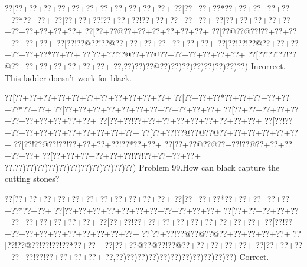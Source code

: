 \documentclass[a5paper]{article}
\begin{document}
\begin{center}
{\goo
\0??[\0??+\0??+\0??+\0??+\0??+\0??+\0??+\0??+\0??+\0??+\0??+
\0??[\0??+\0??+\0??*\0??+\0??+\0??+\0??+\0??+\0??*\0??+\0??+
\0??[\0??+\0??+\0??!\0??+\0??+\0??!\0??+\0??+\0??+\0??+\0??+
\0??[\0??+\0??+\0??+\0??+\0??+\0??+\0??+\0??+\0??+\0??+
\0??[\0??+\0??@\0??+\0??+\0??+\0??+\0??+\0??+
\0??[\0??@\0??@\0??!\0??+\0??+\0??+\0??+\0??+\0??+
\0??[\0??!\0??@\0??!\0??@\0??+\0??+\0??+\0??+\0??+\0??+\0??+
\0??[\0??!\0??!\0??@\0??+\0??+\0??+\0??+\0??+\0??*\0??+\0??+
\0??[\0??+\0??!\0??@\0??+\0??@\0??+\0??+\0??+\0??+\0??+\0??+
\0??[\0??!\0??!\0??!\0??@\0??+\0??+\0??+\0??+\0??+\0??+\0??+
\0??,\0??)\0??)\0??@\0??)\0??)\0??)\0??)\0??)\0??)\0??)\0??)
}
Incorrect. This ladder doesn't work for black.

\end{center}
\newpage
\begin{center}
{\goo
\0??[\0??+\0??+\0??+\0??+\0??+\0??+\0??+\0??+\0??+\0??+\0??+
\0??[\0??+\0??+\0??*\0??+\0??+\0??+\0??+\0??+\0??*\0??+\0??+
\0??[\0??+\0??+\0??+\0??+\0??+\0??+\0??+\0??+\0??+\0??+\0??+
\0??[\0??+\0??+\0??+\0??+\0??+\0??+\0??+\0??+\0??+\0??+\0??+
\0??[\0??+\0??!\0??+\0??+\0??+\0??+\0??+\0??+\0??+\0??+\0??+
\0??[\0??!\0??+\0??+\0??+\0??+\0??+\0??+\0??+\0??+\0??+\0??+
\0??[\0??+\0??!\0??@\0??@\0??@\0??+\0??+\0??+\0??+\0??+\0??+
\0??[\0??!\0??@\0??!\0??!\0??+\0??+\0??+\0??!\0??*\0??+\0??+
\0??[\0??+\0??@\0??@\0??+\0??!\0??@\0??+\0??+\0??+\0??+\0??+
\0??[\0??+\0??+\0??+\0??+\0??+\0??!\0??!\0??+\0??+\0??+\0??+
\0??,\0??)\0??)\0??)\0??)\0??)\0??)\0??)\0??)\0??)\0??)\0??)
}
Problem 99.How can black capture the cutting stones?

\end{center}
\begin{center}
{\goo
\0??[\0??+\0??+\0??+\0??+\0??+\0??+\0??+\0??+\0??+\0??+\0??+
\0??[\0??+\0??+\0??*\0??+\0??+\0??+\0??+\0??+\0??*\0??+\0??+
\0??[\0??+\0??+\0??+\0??+\0??+\0??+\0??+\0??+\0??+\0??+\0??+
\0??[\0??+\0??+\0??+\0??+\0??+\0??+\0??+\0??+\0??+\0??+\0??+
\0??[\0??+\0??!\0??+\0??+\0??+\0??+\0??+\0??+\0??+\0??+\0??+
\0??[\0??!\0??+\0??+\0??+\0??+\0??+\0??+\0??+\0??+\0??+\0??+
\0??[\0??+\0??!\0??@\0??@\0??@\0??+\0??+\0??+\0??+\0??+
\0??[\0??!\0??@\0??!\0??!\0??!\0??*\0??+\0??+
\0??[\0??+\0??@\0??@\0??!\0??@\0??+\0??+\0??+\0??+\0??+
\0??[\0??+\0??+\0??+\0??+\0??!\0??!\0??+\0??+\0??+\0??+
\0??,\0??)\0??)\0??)\0??)\0??)\0??)\0??)\0??)\0??)\0??)\0??)
}
Correct. 

\end{center}
\end{document}
